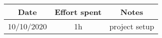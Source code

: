\documentclass[../main.tex]{subfiles}
\begin{document}
    \begin{center}
        \begin{tabular}{|c| |c| |c|} 
            \hline
            Date & Effort spent & Notes\\ [0.5ex] 
            \hline\hline
            10/10/2020 & 1h & project setup\\ 
            \hline
        \end{tabular}
    \end{center}
\end{document}
